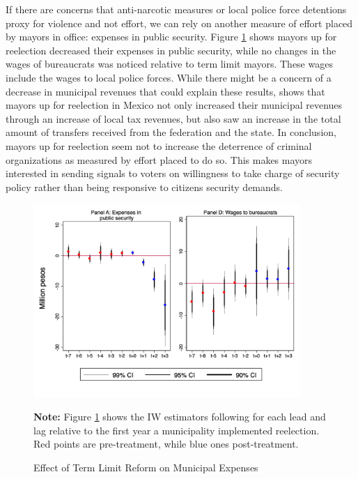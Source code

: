 \documentclass[12pt]{amsart}
\numberwithin{equation}{section}
\theoremstyle{definition}
\theoremstyle{definition}
\theoremstyle{definition}
\begin{document}
If there are concerns that anti-narcotic measures or local police force detentions proxy for violence and not effort, we can rely on another measure of effort placed by mayors in office: expenses in public security. Figure \ref{fig:expenses} shows mayors up for reelection decreased their expenses in public security, while no changes in the wages of bureaucrats was noticed relative to term limit mayors. These wages include the wages to local police forces. %
While there might be a concern of a decrease in municipal revenues that could explain these results, \citet{ch_2021} shows that mayors up for reelection in Mexico not only increased their municipal revenues through an increase of local tax revenues, but also saw an increase in the total amount of transfers received from the federation and the state. In conclusion, mayors up for  reelection seem not to increase the deterrence of criminal organizations as measured by effort placed to do so. This makes mayors interested in sending signals to voters on willingness to take charge of security policy rather than being responsive to citizens security demands. 
  
 \begin{figure}[H]   
\centering
 \caption{Effect of Term Limit Reform on Municipal Expenses}
 \label{fig:expenses}
\includegraphics[width=0.9\textwidth]{Figures/expenses_allyears.png}
       \captionsetup{justification=centering}
         
 \textbf{Note:} Figure \ref{fig:expenses} shows the IW estimators following \citet{abraham_sun_2020} for each lead and lag relative to the first year a municipality implemented reelection. Red points are pre-treatment, while blue ones post-treatment. 
                     
\end{figure}   
\end{document}
